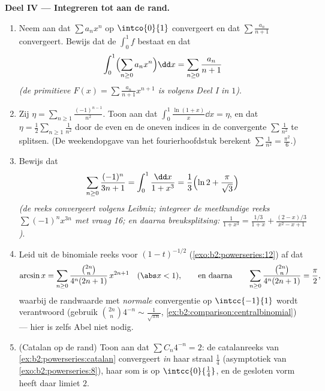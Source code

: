 \begin{problem}
\medskip
\noindent\textbf{Deel IV --- Integreren tot aan de rand.}
\begin{enumerate}[resume]
  \item Neem aan dat $\sum a_nx^n$ op $\intco{0}{1}$ convergeert en
        dat $\sum \frac{a_n}{n+1}$ convergeert. Bewijs dat de
         $\int_0^1 f$ bestaat en dat
        \[
        \int_0^1 \Bigl(\sum_{n\geq0} a_nx^n\Bigr)\dd x
        = \sum_{n\geq0}\frac{a_n}{n+1}
        \]
        \emph{(de primitieve $F(x) = \sum\frac{a_n}{n+1}x^{n+1}$
        is volgens Deel I  in $1$)}.
  \item Zij $\eta = \sum_{n\geq1}\frac{(-1)^{n-1}}{n^2}$. Toon aan
        dat $\int_0^1 \frac{\ln(1+x)}{x}\dd x = \eta$, en dat
        $\eta = \frac12\sum_{n\geq1}\frac{1}{n^2}$ door de even en
        de oneven indices in de  convergente $\sum
        \frac1{n^2}$ te splitsen. (De weekendopgave van het
        fourierhoofdstuk berekent $\sum\frac1{n^2} =
        \frac{\pi^2}{6}$.)
  \item Bewijs dat
        \[
        \sum_{n\geq0}\frac{(-1)^n}{3n+1}
        = \int_0^1\frac{\dd x}{1+x^3}
        = \frac13\Bigl(\ln 2 + \frac{\pi}{\sqrt3}\Bigr)
        \]
        \emph{(de reeks convergeert volgens Leibniz; integreer de
        meetkundige reeks $\sum(-1)^nx^{3n}$ met vraag 16; en
        daarna breuksplitsing: $\frac{1}{1+x^3} =
        \frac{1/3}{1+x} + \frac{(2-x)/3}{x^2-x+1}$)}.
  \item Leid uit de binomiale reeks voor $(1-t)^{-1/2}$
        (\cref{exo:b2:powerseries:12}) af dat
        \[
        \arcsin x = \sum_{n\geq0}
        \frac{\binom{2n}{n}}{4^n(2n+1)}\,x^{2n+1}
        \quad(\abs x < 1),
        \qquad\text{en daarna}\qquad
        \sum_{n\geq0}\frac{\binom{2n}{n}}{4^n(2n+1)}
        = \frac\pi2 ,
        \]
        waarbij de randwaarde met \emph{normale} convergentie op
        $\intcc{-1}{1}$ wordt verantwoord (gebruik
        $\binom{2n}n4^{-n} \sim \frac{1}{\sqrt{\pi n}}$,
        \cref{ex:b2:comparison:centralbinomial}) --- hier is zelfs
        Abel niet nodig.
  \item (Catalan op de rand) Toon aan dat $\sum C_n 4^{-n} = 2$: de
        catalanreeks van \cref{ex:b2:powerseries:catalan}
        convergeert \emph{in} haar straal $\frac14$ (asymptotiek
        van \cref{exo:b2:powerseries:8}), haar som is  op
        $\intcc{0}{\frac14}$, en de gesloten vorm heeft daar
        limiet $2$.
\end{enumerate}


\end{problem}
